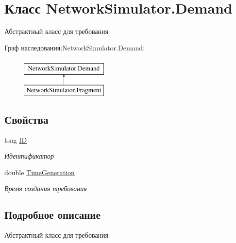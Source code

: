 \hypertarget{class_network_simulator_1_1_demand}{}\section{Класс Network\+Simulator.\+Demand}
\label{class_network_simulator_1_1_demand}


Абстрактный класс для требования  


Граф наследования\+:Network\+Simulator.\+Demand\+:\begin{figure}[H]
\begin{center}
\leavevmode
\includegraphics[height=2.000000cm]{class_network_simulator_1_1_demand}
\end{center}
\end{figure}
\subsection*{Свойства}
\begin{DoxyCompactItemize}
\item 
long \hyperlink{class_network_simulator_1_1_demand_af9ba0cb40b82eb7be679676425cad207}{ID}
\begin{DoxyCompactList}\small\item\em Идентификатор \end{DoxyCompactList}\item 
double \hyperlink{class_network_simulator_1_1_demand_abd1660da7871505ae8ad8dd282dc3d29}{Time\+Generation}
\begin{DoxyCompactList}\small\item\em Время создания требования \end{DoxyCompactList}\end{DoxyCompactItemize}


\subsection{Подробное описание}
Абстрактный класс для требования 




